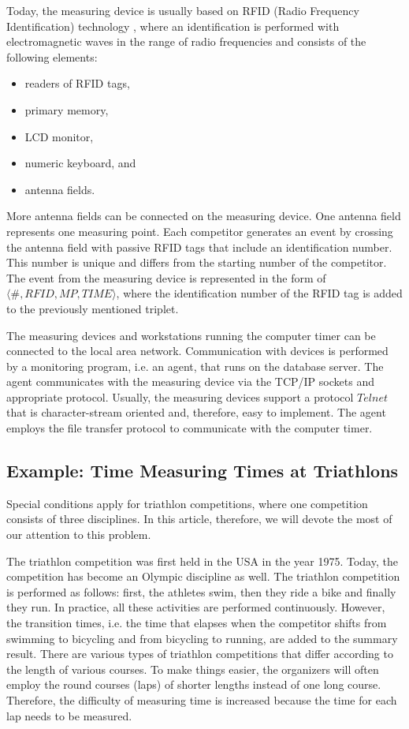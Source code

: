 \documentclass[preprint, prX]{revtex4}
\begin{document}
Today, the measuring device is usually based on RFID (Radio Frequency Identification) technology \cite{Finkenzeller:2010}, where an
identification is performed with electromagnetic waves in the range of radio frequencies and consists of the following elements:

\begin{itemize}
  \item readers of RFID tags,
  \item primary memory,
  \item LCD monitor,
  \item numeric keyboard, and
  \item antenna fields.
\end{itemize}

More antenna fields can be connected on the measuring device. One antenna field represents one measuring point. Each competitor
generates an event by crossing the antenna field with passive RFID tags that include an identification number. This number is unique and differs from the starting number of the competitor. The event from the measuring device is represented in the form of
$\langle\#,RFID,MP,TIME\rangle$, where the identification number of the RFID tag is added to the previously mentioned triplet.

The measuring devices and workstations running the computer timer can be connected to the local area network. Communication with devices is performed by a monitoring program, i.e. an agent, that runs on the database server. The agent communicates with the measuring device
via the TCP/IP sockets and appropriate protocol. Usually, the measuring devices support a protocol $Telnet$ that is character-stream
oriented and, therefore, easy to implement. The agent employs the file transfer protocol to communicate with the computer timer.

\subsection{Example: Time Measuring Times at Triathlons}

Special conditions apply for triathlon competitions, where one competition consists of three disciplines. In this article,
therefore, we will devote the most of our attention to this problem.

The triathlon competition was first held in the USA in the year 1975. Today, the competition has become an Olympic discipline as well.
The triathlon competition is performed as follows: first, the athletes swim, then they ride a bike and finally they run. In practice,
all these activities are performed continuously. However, the transition times, i.e. the time that elapses when the competitor shifts
from swimming to bicycling and from bicycling to running, are added to the summary result. There are various types of triathlon
competitions that differ according to the length of various courses. To make things easier, the organizers will often employ the round
courses (laps) of shorter lengths instead of one long course. Therefore, the difficulty of measuring time is increased because the time
for each lap needs to be measured.
\end{document}
